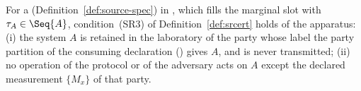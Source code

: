 \begin{assumption}
\label{ass:src}
For a  (Definition~\ref{def:source-spec}) in
, which fills the marginal slot with
$\tau_A\in\Seq{A}$, condition~(SR3) of Definition~\ref{def:srcert} holds of
the apparatus:
(i) the system $A$ is retained in the laboratory of the party whose label
the party partition of the consuming declaration
() gives $A$, and is never
transmitted;
(ii) no operation of the protocol or of the adversary acts on $A$ except the
declared measurement $\{M_x\}$ of that party.
\end{assumption}
